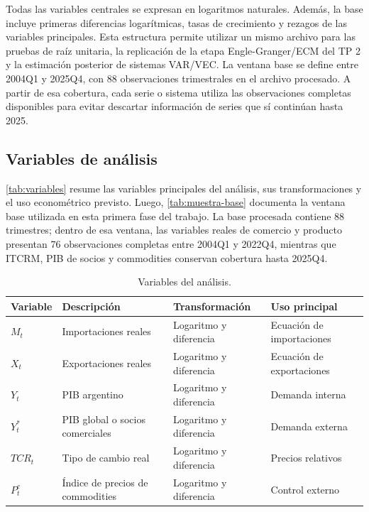 \documentclass[11pt,a4paper]{article}
\begin{document}
	Todas las variables centrales se expresan en logaritmos naturales. Además, la
	base incluye primeras diferencias logarítmicas, tasas de crecimiento y rezagos
	de las variables principales. Esta estructura permite utilizar un mismo archivo
	para las pruebas de raíz unitaria, la replicación de la etapa Engle-Granger/ECM
	del TP 2 y la estimación posterior de sistemas VAR/VEC. La ventana base se
	define entre 2004Q1 y 2025Q4, con 88 observaciones trimestrales en el archivo
	procesado. A partir de esa cobertura, cada serie o sistema utiliza las
	observaciones completas disponibles para evitar descartar información de series
	que sí continúan hasta 2025.
	
	\subsection{Variables de análisis}
	\label{subsec:datos-variables}
	
	\autoref{tab:variables} resume las variables principales del análisis, sus
	transformaciones y el uso econométrico previsto. Luego,
	\autoref{tab:muestra-base} documenta la ventana base utilizada en esta primera
	fase del trabajo. La base procesada contiene 88 trimestres; dentro de esa
	ventana, las variables reales de comercio y producto presentan 76 observaciones
	completas entre 2004Q1 y 2022Q4, mientras que ITCRM, PIB de socios y commodities
	conservan cobertura hasta 2025Q4.
	
	\begin{table}[H]
		\centering
		\caption{Variables del análisis.}
		\label{tab:variables}
		\small
		\begin{tabular}{p{3.2cm}p{4.5cm}p{3.2cm}p{3.2cm}}
			\toprule
			Variable & Descripción & Transformación & Uso principal \\
			\midrule
			$M_t$ & Importaciones reales & Logaritmo y diferencia & Ecuación de importaciones \\
			$X_t$ & Exportaciones reales & Logaritmo y diferencia & Ecuación de exportaciones \\
			$Y_t$ & PIB argentino & Logaritmo y diferencia & Demanda interna \\
			$Y_t^*$ & PIB global o socios comerciales & Logaritmo y diferencia & Demanda externa \\
			$TCR_t$ & Tipo de cambio real & Logaritmo y diferencia & Precios relativos \\
			$P_t^c$ & Índice de precios de commodities & Logaritmo y diferencia & Control externo \\
			\bottomrule
		\end{tabular}
	\end{table}
	
\end{document}
